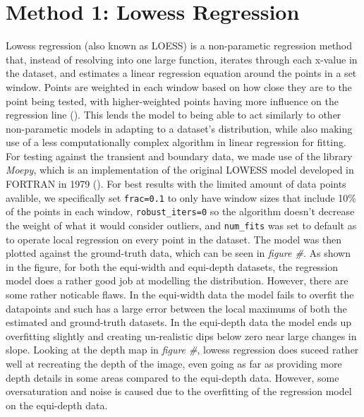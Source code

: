 \documentclass[letterpaper,12pt]{article}
\begin{document}
\section{Method 1: Lowess Regression}
Lowess regression (also known as LOESS) is a non-parametic regression method that, instead 
of resolving into one large function, iterates through each x-value in the dataset, and 
estimates a linear regression equation around the points in a set window. Points are 
weighted in each window based on how close they are to the point being tested, with 
higher-weighted points having more influence on the regression line (\cite{Figueira_2021}). 
This lends the model to being able to act similarly to other non-parametic models in adapting
to a dataset's distribution, while also making use of a less computationally complex algorithm
in linear regression for fitting. For testing against the transient and boundary data, we
made use of the library \emph{Moepy}, which is an implementation of the original LOWESS model 
developed in FORTRAN in 1979 (\cite{ayrton_bourn_2021_4812979}). For best results with the
limited amount of data points avalible, we specifically set \verb|frac=0.1| to only have window
sizes that include 10\% of the points in each window, \verb|robust_iters=0| so the algorithm
doesn't decrease the weight of what it would consider outliers, and \verb|num_fits| was set
to default as to operate local regression on every point in the dataset. The model was
then plotted against the ground-truth data, which can be seen in \emph{figure \#}. As shown
in the figure, for both the equi-width and equi-depth datasets, the regression model does
a rather good job at modelling the distribution. However, there are some rather noticable flaws.
In the equi-width data the model fails to overfit the datapoints and such has a large error
between the local maximums of both the estimated and ground-truth datasets. In the equi-depth
data the model ends up overfitting slightly and creating un-realistic dips below zero near large
changes in slope. Looking at the depth map in \emph{figure \#}, lowess regression does suceed
rather well at recreating the depth of the image, even going as far as providing more depth details
in some areas compared to the equi-depth data. However, some oversaturation and noise is caused
due to the overfitting of the regression model on the equi-depth data.
\end{document}
